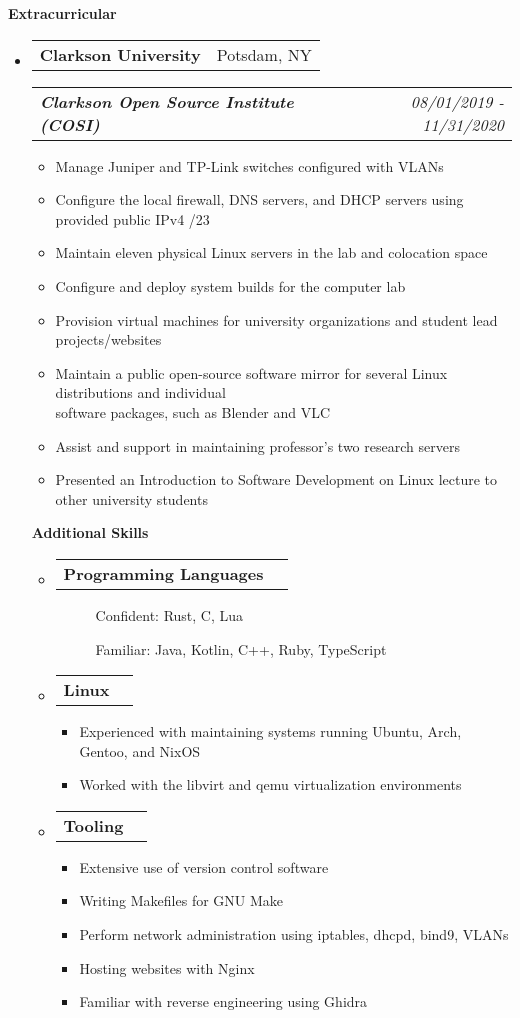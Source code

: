 \documentclass[letterpaper,11pt]{article}
\makeatletter
\newcommand{\resitem}[1]{\item #1 \vspace{-3pt}}
\newcommand{\resheading}[1]{{\large {\textbf{#1 \vphantom{p\^{E}}}}}\vspace{-3pt}}
\newcommand{\topheading}[2]{
\begin{tabular*}{6.5in}{l@{\extracolsep{\fill}}r}
		\textbf{#1} & #2 \\
\end{tabular*}}
\newcommand{\bottomheading}[2]{
\begin{tabular*}{6.5in}{l@{\extracolsep{\fill}}r}
		\textit{\textbf{#1}} & \textit{#2} \\
\end{tabular*}\vspace{-6pt}}
\makeatother
\begin{document}

\resheading{Extracurricular}
\begin{itemize}
\item[]
\topheading{Clarkson University}{Potsdam, NY}
\bottomheading{Clarkson Open Source Institute (COSI)}{08/01/2019 - 11/31/2020}
\begin{itemize}
        \resitem{Manage Juniper and TP-Link switches configured with VLANs}
        \resitem{Configure the local firewall, DNS servers, and DHCP servers using provided public IPv4 /23}
        \resitem{Maintain eleven physical Linux servers in the lab and colocation space}
        \resitem{Configure and deploy system builds for the computer lab}
        \resitem{Provision virtual machines for university organizations and student lead projects/websites}
        \resitem{Maintain a public open-source software mirror for several Linux distributions and individual \\\quad software packages, such as Blender and VLC}
        \resitem{Assist and support in maintaining professor's two research servers}
        \resitem{Presented an Introduction to Software Development on Linux lecture to other university students}
\end{itemize}

\resheading{Additional Skills}
\begin{itemize}

\item[]
\topheading{Programming Languages}{}
\begin{description}
	\item[]{Confident: Rust, C, Lua}
        \item[]{Familiar: Java, Kotlin, C++, Ruby, TypeScript}
\end{description}

\item[]
\topheading{Linux}{}
\begin{itemize}
	\resitem{Experienced with maintaining systems running Ubuntu, Arch, Gentoo, and NixOS}
        \resitem{Worked with the libvirt and qemu virtualization environments}
\end{itemize}

\item[]
\topheading{Tooling}{}
\begin{itemize}
	\resitem{Extensive use of version control software}
        \resitem{Writing Makefiles for GNU Make}
        \resitem{Perform network administration using iptables, dhcpd, bind9, VLANs}
        \resitem{Hosting websites with Nginx}
        \resitem{Familiar with reverse engineering using Ghidra}
\end{itemize}


\end{itemize}
\end{itemize}
\end{document}
